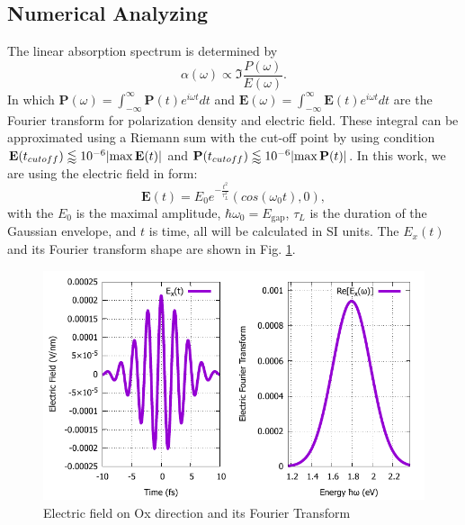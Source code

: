 \documentclass[12pt,english,a4paper]{article}
\begin{document}
\subsection{Numerical Analyzing}
\quad The linear absorption spectrum is determined by\cite{haug_quantum_2009}
\begin{equation}
	\alpha(\omega) \propto \Im{\frac{P(\omega)}{E(\omega)}}.
	\label{absorpt}
\end{equation}
\quad In which $\textbf{P}(\omega)= \int_{-\infty}^{\infty}\textbf{P}(t) e^{i\omega t} dt$ and $\textbf{E}(\omega) = \int_{-\infty}^{\infty}\textbf{E}(t) e^{i\omega t} dt$ are the Fourier transform for polarization density and electric field. These integral can be approximated using a Riemann sum with the cut-off point by using condition $\textbf{E}(t_{cutoff}) \lessapprox 10^{-6} \abs{\max{\textbf{E}(t)}}$ and $\textbf{P}(t_{cutoff}) \lessapprox 10^{-6} \abs{\max{\textbf{P}(t)}}$. In this work, we are using the electric field in form:
\begin{equation}
	\textbf{E}(t) = E_0 e^{-\frac{t^2}{\tau_L^2}}(cos(\omega_0t), 0),
\end{equation} 
with the $E_0$ is the maximal amplitude, $\hbar\omega_0 = E_{\mathrm{gap}}$, $\tau_L$ is the duration of the Gaussian envelope, and $t$ is time, all will be calculated in SI units. The $E_x(t)$ and its Fourier transform shape are shown in Fig. \ref{Et}.\\
\begin{figure}
	\begin{center}
\includegraphics[width = 0.75\linewidth]{Images/EAt.pdf}
\caption{Electric field on Ox direction and its Fourier Transform}
\label{Et}
	\end{center}
\end{figure}
\end{document}
